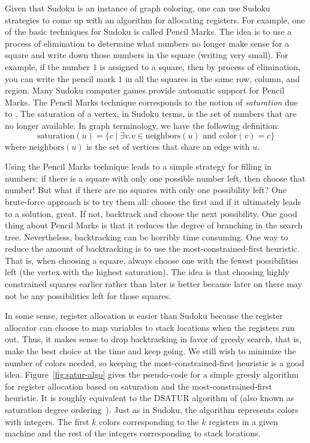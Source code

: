 \documentclass[11pt]{book}
\begin{document}
Given that Sudoku is an instance of graph coloring, one can use Sudoku
strategies to come up with an algorithm for allocating registers. For
example, one of the basic techniques for Sudoku is called Pencil
Marks. The idea is to use a process of elimination to determine what
numbers no longer make sense for a square and write down those
numbers in the square (writing very small). For example, if the number
$1$ is assigned to a square, then by process of elimination, you can
write the pencil mark $1$ in all the squares in the same row, column,
and region. Many Sudoku computer games provide automatic support for
Pencil Marks.
%
The Pencil Marks technique corresponds to the notion of
\emph{saturation} due to \cite{Brelaz:1979eu}.  The saturation of a
vertex, in Sudoku terms, is the set of numbers that are no longer
available. In graph terminology, we have the following definition:
\begin{equation*}
  \mathrm{saturation}(u) = \{ c \;|\; \exists v. v \in \mathrm{neighbors}(u)
     \text{ and } \mathrm{color}(v) = c \}
\end{equation*}
where $\mathrm{neighbors}(u)$ is the set of vertices that share an
edge with $u$.

Using the Pencil Marks technique leads to a simple strategy for
filling in numbers: if there is a square with only one possible number
left, then choose that number! But what if there are no squares with
only one possibility left? One brute-force approach is to try them
all: choose the first  and if it ultimately leads to a solution,
great.  If not, backtrack and choose the next possibility.  One good
thing about Pencil Marks is that it reduces the degree of branching in
the search tree. Nevertheless, backtracking can be horribly time
consuming. One way to reduce the amount of backtracking is to use the
most-constrained-first heuristic. That is, when choosing a square,
always choose one with the fewest possibilities left (the vertex with
the highest saturation).  The idea is that choosing highly constrained
squares earlier rather than later is better because later on there may
not be any possibilities left for those squares.

In some sense, register allocation is easier than Sudoku because the
register allocator can choose to map variables to stack locations when
the registers run out. Thus, it makes sense to drop backtracking in
favor of greedy search, that is, make the best choice at the time and
keep going. We still wish to minimize the number of colors needed, so
keeping the most-constrained-first heuristic is a good idea.
Figure~\ref{fig:satur-algo} gives the pseudo-code for a simple greedy
algorithm for register allocation based on saturation and the
most-constrained-first heuristic. It is roughly equivalent to the
DSATUR algorithm of \cite{Brelaz:1979eu} (also known as saturation
degree ordering~\citep{Gebremedhin:1999fk,Omari:2006uq}).  Just as in
Sudoku, the algorithm represents colors with integers. The first $k$
colors corresponding to the $k$ registers in a given machine and the
rest of the integers corresponding to stack locations.
\end{document}
